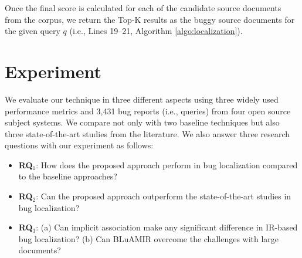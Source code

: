 \documentclass[sigconf,review,anonymous]{acmart}
\begin{document}
Once the final score is calculated for each of the candidate source documents from the corpus, we return the Top-K results as the buggy source documents for the given query $q$ (i.e.,  Lines 19--21, Algorithm \ref{algo:localization}).

\section{Experiment} \label{sec:expANDdiss}
We evaluate our technique in three different aspects using
three widely used performance metrics and 3,431 bug reports (i.e.,
queries) from four open source subject systems. We compare not only with two baseline techniques \cite{vector-space-model,MarcusLSI} but also three state-of-the-art studies \cite{Nguyen,Jian,Saha} from the literature. We also answer three research questions with our experiment as follows: 
\begin{itemize}
	\item \textbf{RQ$_1$}: How does the proposed approach perform in bug localization compared to the baseline approaches? 
	\item \textbf{RQ$_2$}: Can the proposed approach outperform the state-of-the-art studies in bug localization?
	\item \textbf{RQ$_3$}: (a) Can implicit association make any significant difference in IR-based bug localization? (b) Can BLuAMIR overcome the challenges with large documents?   
\end{itemize}

\begin{table}[!tb]
	\caption{Experimental Dataset}
	\label{tab:DDSl}
	\vspace{-.3cm}
\end{table}
\end{document}
